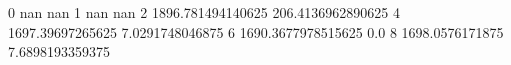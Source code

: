 0 nan nan
1 nan nan
2 1896.781494140625 206.4136962890625
4 1697.39697265625 7.0291748046875
6 1690.3677978515625 0.0
8 1698.0576171875 7.6898193359375
